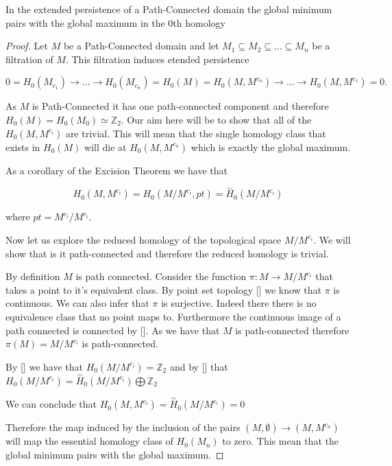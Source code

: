 \begin{prop} In the extended persistence of a Path-Connected domain the global minimum pairs with the global maximum in the 0th homology \end{prop}

\begin{proof}
    Let $M$ be a Path-Connected domain and let $M_1 \subseteq M_2 \subseteq ... \subseteq M_n$ be a filtration of $M$. This filtration induces etended persistence 

$$ 0 = H_0(M_{c_1}) \rightarrow ... \rightarrow H_0(M_{c_n}) = H_0(M) = H_0(M, M^{c_n}) \rightarrow ... \rightarrow H_0(M, M^{c_{1}}) = 0.$$

As $M$ is Path-Connected it has one path-connected component and therefore $H_0(M) = H_0(M_0) \simeq  \mathbb{Z}_2$.  Our aim here will be to show that all of the $H_0(M, M^{c_i})$ are trivial. This will mean that the single homology class that exists in $H_0(M)$ will die at $H_0(M, M^{c_n})$ which is exactly the global maximum.


As a corollary of the Excision Theorem we have that

$$H_0(M, M^{c_i}) = H_0(M / M^{c_i}, pt) = \overset{\sim}{H}_0(M / M^{c_i})$$  

where $pt = M^{c_i} / M^{c_i}$.

Now let us explore the reduced homology of the topological space $M / M^{c_i}$. We will show that is it path-connected and therefore the reduced homology is trivial.


By definition $M$ is path connected. Consider the function $\pi: M \to M/ M^{c_i}$ that takes a point to it's equivalent class. By point set topology [] we know that $\pi$ is continuous. We can also infer that $\pi$ is surjective. Indeed there there is no equivalence class that no point maps to. Furthermore the continuous image of a path connected is connected by []. As we have that $M$ is path-connected therefore $\pi(M) = M / M^{c_i}$ is path-connected. 

By [] we have that $H_0(M / M^{c_i}) = \mathbb{Z}_2$ and by [] that $H_0(M / M^{c_i}) = \overset{\sim}{H}_0(M / M^{c_i}) \bigoplus \mathbb{Z}_2$

We can conclude that $H_0(M, M^{c_i}) = \overset{\sim}{H}_0(M / M^{c_i}) = 0$

Therefore the map induced by the inclusion of the pairs $(M, \emptyset) \to (M, M^{c_n})$ will map the essential homology class of $H_0(M_n)$ to zero. This mean that the global minimum pairs with the global maximum.

\end{proof}

